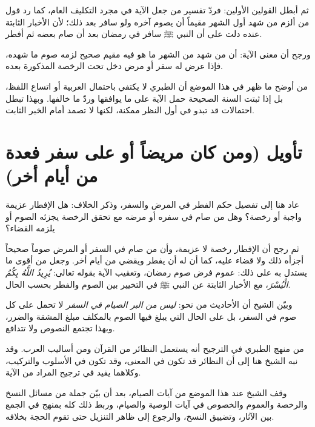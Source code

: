 ثم أبطل  القولين الأولين: فردّ تفسير من جعل الآية في مجرد التكليف العام، كما رد قول من ألزم من شهد أول الشهر مقيماً أن يصوم آخره ولو سافر بعد ذلك؛ لأن الأخبار الثابتة عنده دلت على أن النبي ﷺ سافر في رمضان بعد أن صام بعضه ثم أفطر.

ورجح أن معنى الآية: أن من شهد من الشهر ما هو فيه مقيم صحيح لزمه صوم ما شهده، فإذا عرض له سفر أو مرض دخل تحت الرخصة المذكورة بعده.

\begin{fawaid}
من أوضح ما ظهر في هذا الموضع أن الطبري لا يكتفي باحتمال العربية أو اتساع اللفظ، بل إذا ثبتت السنة الصحيحة حمل الآية على ما يوافقها وردّ ما خالفها. وبهذا تبطل احتمالات قد تبدو في أول النظر ممكنة، لكنها لا تصمد أمام الخبر الثابت.
\end{fawaid}

\separator

\section{تأويل (ومن كان مريضاً أو على سفر فعدة من أيام أخر)}
عاد  هنا إلى تفصيل حكم الفطر في المرض والسفر، وذكر الخلاف: هل الإفطار عزيمة واجبة أو رخصة؟ وهل من صام في سفره أو مرضه مع تحقق الرخصة يجزئه الصوم أو يلزمه القضاء؟

ثم رجح أن الإفطار رخصة لا عزيمة، وأن من صام في السفر أو المرض صوماً صحيحاً أجزأه ذلك ولا قضاء عليه، كما أن له أن يفطر ويقضي من أيام أخر. وجعل من أقوى ما يستدل به على ذلك: عموم فرض صوم رمضان، وتعقيب الآية بقوله تعالى: \textit{يُرِيدُ اللَّهُ بِكُمُ الْيُسْرَ}، مع الأخبار الثابتة عن النبي ﷺ في التخيير بين الصوم والفطر بحسب الحال.

وبيّن الشيخ أن الأحاديث من نحو: \textit{ليس من البر الصيام في السفر} لا تحمل على كل صوم في السفر، بل على الحال التي يبلغ فيها الصوم بالمكلف مبلغ المشقة والضرر، وبهذا تجتمع النصوص ولا تتدافع.

\begin{fawaid}
من منهج الطبري في الترجيح أنه يستعمل النظائر من القرآن ومن أساليب العرب. وقد نبه الشيخ هنا إلى أن النظائر قد تكون في المعنى، وقد تكون في الأسلوب والتركيب، وكلاهما يفيد في ترجيح المراد من الآية.
\end{fawaid}

\separator

وقف الشيخ عند هذا الموضع من آيات الصيام، بعد أن بيّن جملة من مسائل النسخ والرخصة والعموم والخصوص في آيات الوصية والصيام، وربط ذلك كله بمنهج  في الجمع بين الآثار، وتضييق النسخ، والرجوع إلى ظاهر التنزيل حتى تقوم الحجة بخلافه.
